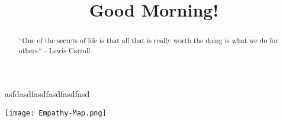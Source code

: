 \documentclass{ximera}
\title{Good Morning!}
\begin{document}
\begin{abstract}
``One of the secrets of life is that all that is really worth the doing is what we do for others.`` - Lewis Carroll
\end{abstract}

\maketitle

asfdasdfasdfasdfasdfasd


\begin{image}
\texttt{[image: Empathy-Map.png]}
\end{image}
\end{document}
